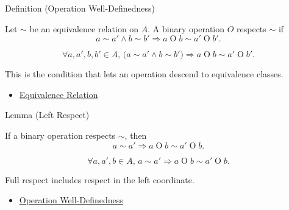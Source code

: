 \begin{definitionbox}{Definition (Operation Well-Definedness)}
\begin{definition}
\label{def:operation-well-definedness}
Let $\sim$ be an equivalence relation on $A$. A binary operation $O$ respects
$\sim$ if
\[
a\sim a' \land b\sim b' \Longrightarrow
a\mathbin{O}b \sim a'\mathbin{O}b'.
\]
\end{definition}

\begin{remark*}
\[
\forall a,a',b,b'\in A,\,
\bigl(a\sim a'\land b\sim b'\bigr)
\Longrightarrow
a\mathbin{O}b \sim a'\mathbin{O}b'.
\]
\end{remark*}

\begin{remark*}[Interpretation]
This is the condition that lets an operation descend to equivalence classes.
\end{remark*}

\begin{dependencies}
\begin{itemize}
  \item \hyperref[def:equivalence-relation]{Equivalence Relation}
\end{itemize}
\end{dependencies}
\end{definitionbox}

\begin{lemmabox}{Lemma (Left Respect)}
\begin{lemma}
\label{lem:operation-left-respect}
If a binary operation respects $\sim$, then
\[
a\sim a' \Longrightarrow a\mathbin{O}b\sim a'\mathbin{O}b.
\]
\end{lemma}
\end{lemmabox}

\begin{remark*}
\[
\forall a,a',b\in A,\,
a\sim a' \Rightarrow a\mathbin{O}b\sim a'\mathbin{O}b.
\]
\end{remark*}

\begin{remark*}[Interpretation]
Full respect includes respect in the left coordinate.
\end{remark*}

\begin{dependencies}
\begin{itemize}
  \item \hyperref[def:operation-well-definedness]{Operation Well-Definedness}
\end{itemize}
\end{dependencies}

